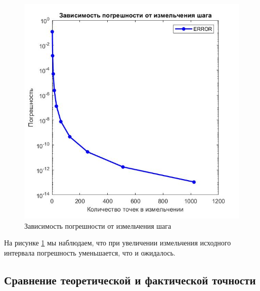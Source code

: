 \documentclass[a4paper]{article}
\begin{document}
\begin{figure}[h!]
\begin{center}
\includegraphics[scale=0.7]{погрешность от зимельчения шага.jpg} 
\end{center}
\caption{Зависимость погрешности от измельчения шага} \label{Рис2}
\end{figure}
На рисунке \ref{Рис2} мы наблюдаем, что при увеличении измельчения исходного интервала погрешность уменьшается, что и ожидалось.


\subsection{Сравнение теоретической и фактической точности} 
\end{document}
